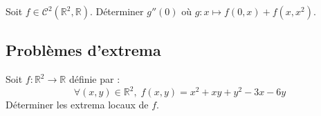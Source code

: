 \documentclass[a4paper,twoside,french,11pt]{VcCours}
\begin{document}
\begin{Exercice}{} Soit $f \in \mathcal{C}^2(\mathbb{R}^2, \mathbb{R})$. Déterminer $g''(0)$ où $g : x \mapsto f(0,x)+f(x,x^2)$.
\end{Exercice}

 
 
  
 \subsection{Problèmes d'extrema}

\begin{Exercice}{} Soit $f : \mathbb{R}^2 \rightarrow \mathbb{R}$ définie par :
$$ \forall (x,y) \in \mathbb{R}^2, \; f(x,y) = x^{2} + xy + y^{2} - 3x - 6y$$
Déterminer les extrema locaux de $f$.
\end{Exercice}
\end{document}
